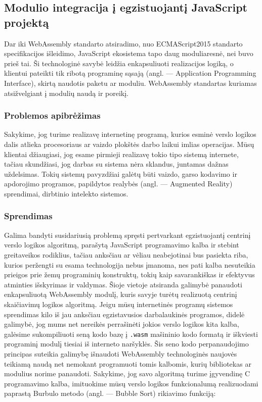 \documentclass{VUMIFPSkursinis}
\begin{document}
\subsection{Modulio integracija į egzistuojantį JavaScript projektą}
Dar iki WebAssembly standarto atsiradimo, nuo ECMAScript2015 standarto specifikacijos išleidimo, JavaScript ekosistema tapo daug moduliaresnė, nei buvo prieš tai. Ši technologinė savybė leidžia enkapsuliuoti realizacijos logiką, o klientui pateikti tik ribotą programinę sąsają (angl. — Application Programming Interface), skirtą naudotis paketu ar moduliu. WebAssembly standartas kuriamas atsižvelgiant į modulių naudą ir poreikį.

\subsubsection{Problemos apibrėžimas}
Sakykime, jog turime realizavę internetinę programą, kurios esminė verslo logikos dalis atlieka procesoriaus ar vaizdo plokštės darbo laikui imlias operacijas. Mūsų klientai džiaugiasi, jog esame pirmieji realizavę tokio tipo sistemą internete, tačiau skundžiasi, jog darbas su sistema nėra sklandus, juntamas dažnas uždelsimas. Tokių sistemų pavyzdžiai galėtų būti vaizdo, garso kodavimo ir apdorojimo programos, papildytos realybės (angl. — Augmented Reality) sprendimai, dirbtinio intelekto sistemos. 
\subsubsection{Sprendimas}
Galima bandyti susidariusią problemą spręsti pertvarkant egzistuojantį centrinį verslo logikos algoritmą, parašytą JavaScript programavimo kalba ir stebint greitaveikos rodiklius, tačiau anksčiau ar vėliau neabejotinai bus pasiekta riba, kurios peržengti su esama technologija nebus įmanoma, nes pati kalba nesuteikia prieigos prie žemų programinių konstruktų, tokių kaip savarankiškas ir efektyvus atminties išskyrimas ir valdymas. 
Šioje vietoje atsiranda galimybė panaudoti enkapsuliuotą WebAssembly modulį, kuris savyje turėtų realizuotą centrinį skaičiavimų logikos algoritmą. Jeigu mūsų internetinės programų sistemos sprendimas kilo iš jau anksčiau egzistavusios darbalaukinės programos, didelė galimybė, jog mums net nereikės perrašinėti jokios verslo logikos kita kalba, galėsime sukompiliuoti seną kodo bazę į \verb|.wasm| mašininio kodo formatą ir iškviesti programinį modulį tiesiai iš interneto naršyklės. Šis seno kodo perpanaudojimo principas suteikia galimybę išnaudoti WebAssembly technologinės naujovės teikiamą naudą net nemokant programuoti tomis kalbomis, kurių bibliotekas ar modulius norime panaudoti. Sakykime, jog savo algoritmą turime įgyvendinę C programavimo kalba, imituokime mūsų verslo logikos funkcionalumą realizuodami paprastą Burbulo metodo (angl. — Bubble Sort) rikiavimo funkciją:
\end{document}
